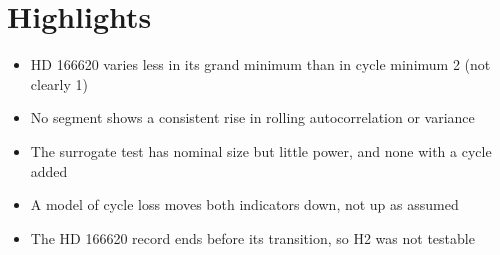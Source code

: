 \documentclass{article}
\begin{document}
\section*{Highlights}
\begin{itemize}
\item HD 166620 varies less in its grand minimum than in cycle minimum 2 (not clearly 1)
\item No segment shows a consistent rise in rolling autocorrelation or variance
\item The surrogate test has nominal size but little power, and none with a cycle added
\item A model of cycle loss moves both indicators down, not up as assumed
\item The HD 166620 record ends before its transition, so H2 was not testable
\end{itemize}
\end{document}
